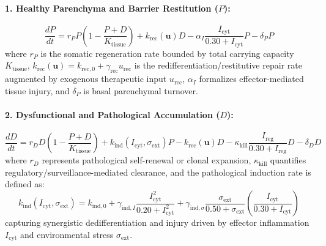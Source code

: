 \documentclass[11pt,a4paper]{article}
\begin{document}
\paragraph{1. Healthy Parenchyma and Barrier Restitution ($P$):}
\begin{equation}
\frac{dP}{dt} = r_P P \left(1 - \frac{P + D}{K_{\mathrm{tissue}}}\right) + k_{\mathrm{rec}}(\bm{u}) D - \alpha_I \frac{I_{\mathrm{cyt}}}{0.30 + I_{\mathrm{cyt}}} P - \delta_P P
\end{equation}
where $r_P$ is the somatic regeneration rate bounded by total carrying capacity $K_{\mathrm{tissue}}$, $k_{\mathrm{rec}}(\bm{u}) = k_{\mathrm{rec},0} + \gamma_{\mathrm{rec}} u_{\mathrm{rec}}$ is the redifferentiation/restitutive repair rate augmented by exogenous therapeutic input $u_{\mathrm{rec}}$, $\alpha_I$ formalizes effector-mediated tissue injury, and $\delta_P$ is basal parenchymal turnover.

\paragraph{2. Dysfunctional and Pathological Accumulation ($D$):}
\begin{equation}
\frac{dD}{dt} = r_D D \left(1 - \frac{P + D}{K_{\mathrm{tissue}}}\right) + k_{\mathrm{ind}}(I_{\mathrm{cyt}}, \sigma_{\mathrm{ext}}) P - k_{\mathrm{rec}}(\bm{u}) D - \kappa_{\mathrm{kill}} \frac{I_{\mathrm{reg}}}{0.30 + I_{\mathrm{reg}}} D - \delta_D D
\end{equation}
where $r_D$ represents pathological self-renewal or clonal expansion, $\kappa_{\mathrm{kill}}$ quantifies regulatory/surveillance-mediated clearance, and the pathological induction rate is defined as:
\begin{equation}
k_{\mathrm{ind}}(I_{\mathrm{cyt}}, \sigma_{\mathrm{ext}}) = k_{\mathrm{ind},0} + \gamma_{\mathrm{ind},I} \frac{I_{\mathrm{cyt}}^2}{0.20 + I_{\mathrm{cyt}}^2} + \gamma_{\mathrm{ind},\sigma} \frac{\sigma_{\mathrm{ext}}}{0.50 + \sigma_{\mathrm{ext}}} \left(\frac{I_{\mathrm{cyt}}}{0.30 + I_{\mathrm{cyt}}}\right)
\end{equation}
capturing synergistic dedifferentiation and injury driven by effector inflammation $I_{\mathrm{cyt}}$ and environmental stress $\sigma_{\mathrm{ext}}$.
\end{document}
